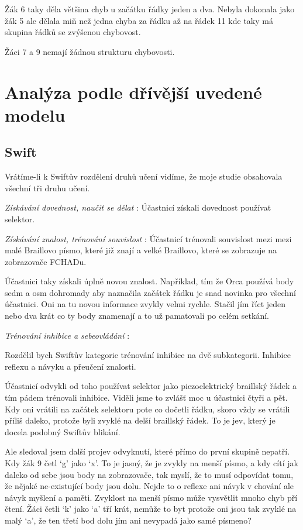 Žák 6 taky děla většina chyb u začátku řádky jeden a dva.  Nebyla dokonala jako žák 5 ale dělala miň než jedna chyba za řádku až na řádek 11 kde taky má skupina řádků se zvýšenou chybovost.

Žáci 7 a 9 nemají žádnou strukturu chybovosti.

\section{Analýza podle dřívější uvedené modelu}

\subsection{Swift}
Vrátíme-li k Swiftův rozdělení druhů učení vidíme, že moje studie obsahovala všechní tři druhu učení.

\textit{Získávání dovednost, naučit se dělat} :
Účastnicí získali dovednost používat selektor.

\textit{Získávání znalost, trénování souvislost} :
Účastnicí trénovali souvislost mezi mezi malé Braillovo písmo, které již znají a velké Braillovo, které se zobrazuje na zobrazovače FCHADu.

Účastnici taky získali úplně novou znalost.  Například, tím že Orca používá body sedm a osm dohromady aby naznačila začátek řádku je snad novinka pro všechní účastnici.  Oni na tu novou informace zvykly velmi rychle.  Stačil jím říct jeden nebo dva krát co ty body znamenají a to už pamatovali po celém setkání.


\textit{Trénování inhibice a sebeovládání} :

Rozdělil bych Swiftův kategorie trénování inhibice na dvě subkategorii.  Inhibice reflexu a návyku a přeučení znalosti.

Účastnicí odvykli od toho používat selektor jako piezoelektrický braillský řádek a tím pádem trénovali inhibice.  Viděli jsme to zvlášť moc u účastnici čtyři a pět.  Kdy oni vrátili na začátek selektoru pote co dočetli řádku, skoro vždy se vrátili příliš daleko, protože byli zvyklé na delší braillský řádek.  To je jev, který je docela podobný Swiftův blikání.

Ale sledoval jsem další projev odvyknutí, které přímo do první skupině nepatří. Kdy žák 9 četl `g' jako `x'. To je jasný, že je zvykly na menší písmo, a kdy cítí jak daleko od sebe jsou body na zobrazovače, tak myslí, že to musí odpovídat tomu, že nějaké ne-existující body jsou dolu.  Nejde to o reflexe ani návyk v chování ale návyk myšlení a paměti.  Zvyklost na menší písmo může vysvětlit mnoho chyb pří čtení.  Žáci četli `k' jako `a' tří krát, nemůže to byt protože oni jsou tak zvyklé na malý `a', že ten třetí bod dolu jím ani nevypadá jako samé písmeno?

